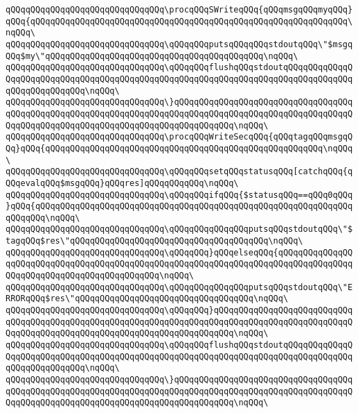 \verb|qQQqqQQqqQQqqQQqqQQqqQQqqQQqqQQq\procqQQqSWriteqQQq{qQQqmsgqQQqmyqQQq}qQQq{qQQqqQQqqQQqqQQqqQQqqQQqqQQqqQQqqQQqqQQqqQQqqQQqqQQqqQQqqQQqqQQq\nqQQq\|\newline
\verb|qQQqqQQqqQQqqQQqqQQqqQQqqQQqqQQq\qQQqqQQqputsqQQqqQQqstdoutqQQq\"$msgqQQq$my\"qQQqqQQqqQQqqQQqqQQqqQQqqQQqqQQqqQQqqQQqqQQq\nqQQq\|\newline
\verb|qQQqqQQqqQQqqQQqqQQqqQQqqQQqqQQq\qQQqqQQqflushqQQqstdoutqQQqqQQqqQQqqQQqqQQqqQQqqQQqqQQqqQQqqQQqqQQqqQQqqQQqqQQqqQQqqQQqqQQqqQQqqQQqqQQqqQQqqQQqqQQqqQQqqQQq\nqQQq\|\newline
\verb|qQQqqQQqqQQqqQQqqQQqqQQqqQQqqQQq\}qQQqqQQqqQQqqQQqqQQqqQQqqQQqqQQqqQQqqQQqqQQqqQQqqQQqqQQqqQQqqQQqqQQqqQQqqQQqqQQqqQQqqQQqqQQqqQQqqQQqqQQqqQQqqQQqqQQqqQQqqQQqqQQqqQQqqQQqqQQqqQQqqQQqqQQq\nqQQq\|\newline
\verb|qQQqqQQqqQQqqQQqqQQqqQQqqQQqqQQq\procqQQqWriteSecqQQq{qQQqtagqQQqmsgqQQq}qQQq{qQQqqQQqqQQqqQQqqQQqqQQqqQQqqQQqqQQqqQQqqQQqqQQqqQQqqQQq\nqQQq\|\newline
\verb|qQQqqQQqqQQqqQQqqQQqqQQqqQQqqQQq\qQQqqQQqsetqQQqstatusqQQq[catchqQQq{qQQqevalqQQq$msgqQQq}qQQqres]qQQqqQQqqQQq\nqQQq\|\newline
\verb|qQQqqQQqqQQqqQQqqQQqqQQqqQQqqQQq\qQQqqQQqifqQQq{$statusqQQq==qQQq0qQQq}qQQq{qQQqqQQqqQQqqQQqqQQqqQQqqQQqqQQqqQQqqQQqqQQqqQQqqQQqqQQqqQQqqQQqqQQqqQQq\nqQQq\|\newline
\verb|qQQqqQQqqQQqqQQqqQQqqQQqqQQqqQQq\qQQqqQQqqQQqqQQqputsqQQqstdoutqQQq\"$tagqQQq$res\"qQQqqQQqqQQqqQQqqQQqqQQqqQQqqQQqqQQqqQQq\nqQQq\|\newline
\verb|qQQqqQQqqQQqqQQqqQQqqQQqqQQqqQQq\qQQqqQQq}qQQqelseqQQq{qQQqqQQqqQQqqQQqqQQqqQQqqQQqqQQqqQQqqQQqqQQqqQQqqQQqqQQqqQQqqQQqqQQqqQQqqQQqqQQqqQQqqQQqqQQqqQQqqQQqqQQqqQQqqQQqqQQq\nqQQq\|\newline
\verb|qQQqqQQqqQQqqQQqqQQqqQQqqQQqqQQq\qQQqqQQqqQQqqQQqputsqQQqstdoutqQQq\"ERRORqQQq$res\"qQQqqQQqqQQqqQQqqQQqqQQqqQQqqQQqqQQq\nqQQq\|\newline
\verb|qQQqqQQqqQQqqQQqqQQqqQQqqQQqqQQq\qQQqqQQq}qQQqqQQqqQQqqQQqqQQqqQQqqQQqqQQqqQQqqQQqqQQqqQQqqQQqqQQqqQQqqQQqqQQqqQQqqQQqqQQqqQQqqQQqqQQqqQQqqQQqqQQqqQQqqQQqqQQqqQQqqQQqqQQqqQQqqQQqqQQqqQQq\nqQQq\|\newline
\verb|qQQqqQQqqQQqqQQqqQQqqQQqqQQqqQQq\qQQqqQQqflushqQQqstdoutqQQqqQQqqQQqqQQqqQQqqQQqqQQqqQQqqQQqqQQqqQQqqQQqqQQqqQQqqQQqqQQqqQQqqQQqqQQqqQQqqQQqqQQqqQQqqQQqqQQq\nqQQq\|\newline
\verb|qQQqqQQqqQQqqQQqqQQqqQQqqQQqqQQq\}qQQqqQQqqQQqqQQqqQQqqQQqqQQqqQQqqQQqqQQqqQQqqQQqqQQqqQQqqQQqqQQqqQQqqQQqqQQqqQQqqQQqqQQqqQQqqQQqqQQqqQQqqQQqqQQqqQQqqQQqqQQqqQQqqQQqqQQqqQQqqQQqqQQqqQQq\nqQQq\|\newline

